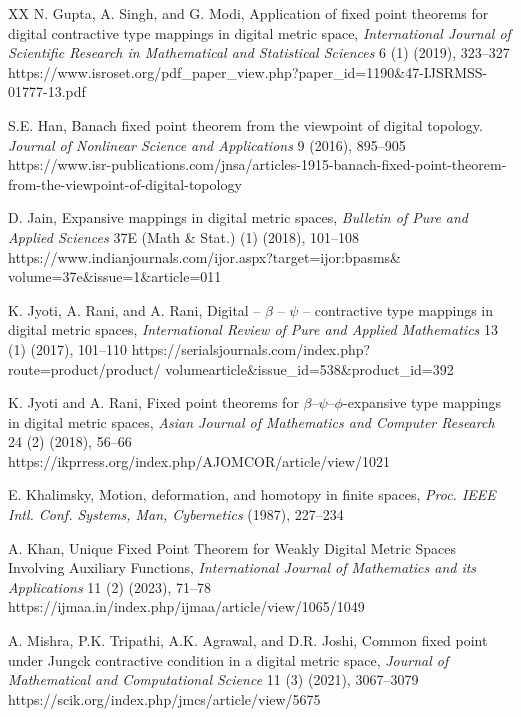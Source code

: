 \documentclass{article}
\numberwithin{thm}{section}
\begin{document}
\begin{thebibliography}{XX}
N. Gupta, A. Singh,
and G. Modi,
Application of fixed point 
theorems for digital contractive 
type mappings in digital metric space,
{\em International Journal of Scientific Research in 
Mathematical and Statistical Sciences}
6 (1) (2019), 323--327
\newline
https://www.isroset.org/pdf\_paper\_view.php?paper\_id=1190\&47-IJSRMSS-01777-13.pdf

S.E. Han, 
Banach fixed point theorem from the
viewpoint of digital topology.
{\em Journal of Nonlinear Science and
Applications} 9 (2016), 895--905 \newline
https://www.isr-publications.com/jnsa/articles-1915-banach-fixed-point-theorem-from-the-viewpoint-of-digital-topology

D. Jain,
Expansive mappings in digital 
metric spaces,
{\em Bulletin of Pure and Applied Sciences}
37E (Math \& Stat.) (1) (2018), 101--108
\newline
https://www.indianjournals.com/ijor.aspx?target=ijor:bpasms\& \newline volume=37e\&issue=1\&article=011 

K. Jyoti, A. Rani, and A. Rani,
Digital -- $\beta$ -- $\psi$ -- contractive type
mappings in digital metric spaces, 
{\em International Review
of Pure and Applied Mathematics} 13 (1) (2017), 101--110
\newline
https://serialsjournals.com/index.php?route=product/product/ \newline volumearticle\&issue\_id=538\&product\_id=392

K. Jyoti and A. Rani, Fixed point theorems for $\beta$--$\psi$--$\phi$-expansive type mappings in
digital metric spaces, 
{\em Asian Journal of Mathematics and Computer Research} 
24 (2) (2018), 56--66
\newline
https://ikprress.org/index.php/AJOMCOR/article/view/1021

E. Khalimsky,
Motion, deformation, and homotopy in finite spaces,
{\em Proc. IEEE Intl. Conf. Systems, Man, Cybernetics}
(1987), 227--234

A. Khan,
Unique Fixed Point Theorem for Weakly 
Digital Metric Spaces Involving 
Auxiliary Functions,
{\em International Journal of
Mathematics and its Applications}
11 (2) (2023),
71--78
\newline
https://ijmaa.in/index.php/ijmaa/article/view/1065/1049

A. Mishra, P.K. Tripathi, A.K. Agrawal, and D.R. Joshi,
 Common fixed point under Jungck contractive condition in a digital metric space,
 {\em Journal of Mathematical and Computational Science} 
 11 (3) (2021), 3067--3079
 \newline
 https://scik.org/index.php/jmcs/article/view/5675


\end{thebibliography}
\end{document}
